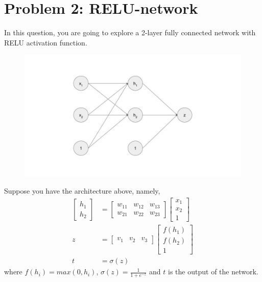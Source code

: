 \documentclass{article}
\begin{document}
    \section*{Problem 2: RELU-network}
    In this question, you are going to explore a 2-layer
    fully connected network with RELU activation function. 
    \begin{figure}[h!]
        \includegraphics[width=\textwidth]{nn.jpg}
    \end{figure}
    \newline
    Suppose you have the architecture above, namely, 
    \begin{align*}
        \begin{bmatrix}h_1 \\ h_2 \end{bmatrix} &= \begin{bmatrix}w_{11} & w_{12} & w_{13} \\w_{21} & w_{22} & w_{23}\end{bmatrix} \begin{bmatrix} x_1 \\ x_2 \\ 1\end{bmatrix} \\
        z &= \begin{bmatrix} v_1 & v_2 & v_3\end{bmatrix} \begin{bmatrix}
        f(h_1) \\ f(h_2) \\ 1 
        \end{bmatrix}  \\
        t &= \sigma(z) 
    \end{align*}
    where $f(h_i) = max(0, h_i)$, $\sigma(z) = \frac{1}{1 + e^{-z}}$ and $t$ is the output of the network.
\end{document}

